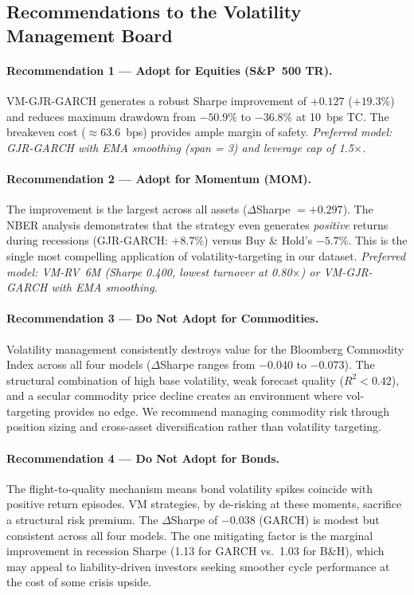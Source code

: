 \documentclass[12pt, a4paper]{article}
\begin{document}
\subsection{Recommendations to the Volatility Management Board}

\paragraph{Recommendation 1 --- Adopt for Equities (S\&P~500 TR).} VM-GJR-GARCH generates
a robust Sharpe improvement of $+0.127$ ($+19.3\%$) and reduces maximum drawdown from
$-50.9\%$ to $-36.8\%$ at 10~bps TC. The breakeven cost ($\approx$63.6~bps) provides
ample margin of safety. \textit{Preferred model: GJR-GARCH with EMA smoothing (span = 3)
and leverage cap of 1.5$\times$.}

\paragraph{Recommendation 2 --- Adopt for Momentum (MOM).} The improvement is the largest
across all assets ($\Delta$Sharpe $= +0.297$). The NBER analysis demonstrates that the
strategy even generates \emph{positive} returns during recessions (GJR-GARCH: $+8.7\%$)
versus Buy \& Hold's $-5.7\%$. This is the single most compelling application of
volatility-targeting in our dataset. \textit{Preferred model: VM-RV~6M (Sharpe 0.400,
lowest turnover at 0.80$\times$) or VM-GJR-GARCH with EMA smoothing.}

\paragraph{Recommendation 3 --- Do Not Adopt for Commodities.} Volatility management
consistently destroys value for the Bloomberg Commodity Index across all four models
($\Delta$Sharpe ranges from $-0.040$ to $-0.073$). The structural combination of high
base volatility, weak forecast quality ($R^2 < 0.42$), and a secular commodity price
decline creates an environment where vol-targeting provides no edge. We recommend managing
commodity risk through position sizing and cross-asset diversification rather than
volatility targeting.

\paragraph{Recommendation 4 --- Do Not Adopt for Bonds.} The flight-to-quality mechanism
means bond volatility spikes coincide with positive return episodes. VM strategies, by
de-risking at these moments, sacrifice a structural risk premium. The $\Delta$Sharpe of
$-0.038$ (GARCH) is modest but consistent across all four models. The one mitigating
factor is the marginal improvement in recession Sharpe (1.13 for GARCH vs.\ 1.03 for
B\&H), which may appeal to liability-driven investors seeking smoother cycle performance
at the cost of some crisis upside.
\end{document}
